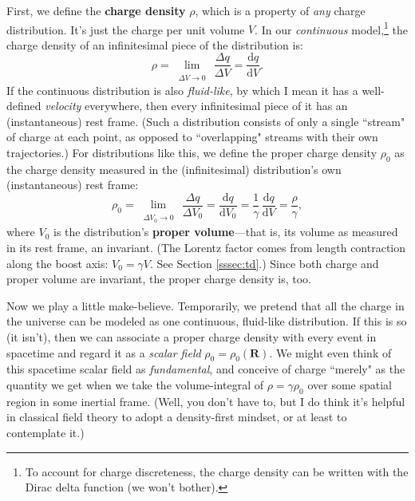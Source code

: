 \documentclass[12pt]{article}
\renewcommand{\vv}[1]{\mathbf{#1}}
\newcommand{\dd}[1]{\mathrm{d}#1}
\begin{document}
First, we define the \textbf{charge density} $\rho$, which is a property of \emph{any} charge distribution. It's just the charge per unit volume $V$. In our \emph{continuous} model,\footnote{To account for charge discreteness, the charge density can be written with the Dirac delta function (we won't bother).} the charge density of an infinitesimal piece of the distribution is:
\begin{equation*}
\rho = \lim\limits_{\substack{\\ \Delta V \to 0}} \, \dfrac{\Delta q}{\Delta V} = \dfrac{\dd q}{\dd V} .
\end{equation*}
If the continuous distribution is also \emph{fluid-like}, by which I mean it has a well-defined \emph{velocity} everywhere, then every infinitesimal piece of it has an (instantaneous) rest frame. (Such a distribution consists of only a single ``stream" of charge at each point, as opposed to ``overlapping" streams with their own trajectories.) For distributions like this, we define the proper charge density $\rho_0$ as the charge density measured in the (infinitesimal) distribution's own (instantaneous) rest frame:
\begin{equation*}
\rho_0 = \lim\limits_{\substack{\\ \Delta V_0 \to 0}} \, \dfrac{\Delta q}{\Delta V_0} = \dfrac{\dd q}{\dd V_0} = \dfrac{1}{\gamma} \, \dfrac{\dd q}{\dd V} = \dfrac{\rho}{\gamma},
\end{equation*}
where $V_0$ is the distribution's \textbf{proper volume}---that is, its volume as measured in its rest frame, an invariant. (The Lorentz factor comes from length contraction along the boost axis: $V_0 = \gamma V$. See Section \ref{sssec:td}.) Since both charge and proper volume are invariant, the proper charge density is, too.

Now we play a little make-believe. Temporarily, we pretend that all the charge in the universe can be modeled as one continuous, fluid-like distribution. If this is so (it isn't), then we can associate a proper charge density with every event in spacetime and regard it as a \emph{scalar field} ${\rho_0 = \rho_0 (\vv R)}$. We might even think of this spacetime scalar field as \emph{fundamental}, and conceive of charge ``merely" as the quantity we get when we take the volume-integral of $\rho = \gamma \rho_0$ over some spatial region in some inertial frame. (Well, you don't have to, but I do think it's helpful in classical field theory to adopt a density-first mindset, or at least to contemplate it.)
\end{document}

